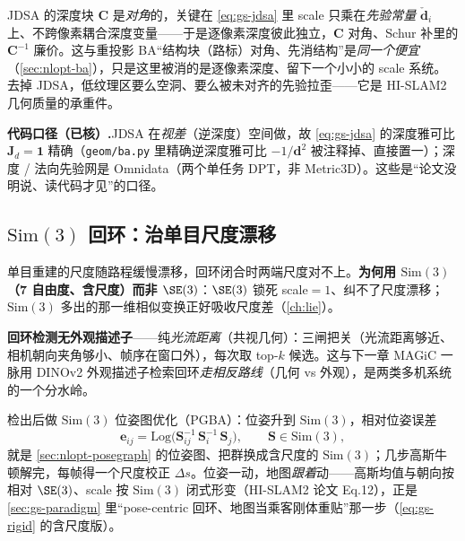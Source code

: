 \begin{insight}
JDSA 的深度块 $\mathbf C$ 是\emph{对角}的，关键在 \cref{eq:gs-jdsa} 里 scale 只乘在\emph{先验常量} $\check{\mathbf d}_i$ 上、不跨像素耦合深度变量——于是逐像素深度彼此独立，$\mathbf C$ 对角、Schur 补里的 $\mathbf C^{-1}$ 廉价。这与重投影 BA“结构块（路标）对角、先消结构”是\emph{同一个便宜}（\cref{sec:nlopt-ba}），只是这里被消的是逐像素深度、留下一个小小的 scale 系统。去掉 JDSA，低纹理区要么空洞、要么被未对齐的先验拉歪——它是 HI-SLAM2 几何质量的承重件。
\end{insight}

\begin{note}
\textbf{代码口径（已核）.}\;JDSA 在\emph{视差}（逆深度）空间做，故 \cref{eq:gs-jdsa} 的深度雅可比 $\mathbf J_d=\mathbf 1$ 精确（\texttt{geom/ba.py} 里精确逆深度雅可比 $-1/\mathbf d^2$ 被注释掉、直接置一）；深度 / 法向先验网是 Omnidata（两个单任务 DPT，非 Metric3D）。这些是“论文没明说、读代码才见”的口径。
\end{note}

\subsection{$\mathrm{Sim}(3)$ 回环：治单目尺度漂移}

单目重建的尺度随路程缓慢漂移，回环闭合时两端尺度对不上。\textbf{为何用 $\mathrm{Sim}(3)$（7 自由度、含尺度）而非 $\SE(3)$}：$\SE(3)$ 锁死 scale$=1$、纠不了尺度漂移；$\mathrm{Sim}(3)$ 多出的那一维相似变换正好吸收尺度差（\cref{ch:lie}）。

\textbf{回环检测无外观描述子}——纯\emph{光流距离}（共视几何）：三闸把关（光流距离够近、相机朝向夹角够小、帧序在窗口外），每次取 top-$k$ 候选。这与下一章 MAGiC 一脉用 DINOv2 外观描述子检索回环\emph{走相反路线}（几何 vs 外观），是两类多机系统的一个分水岭。

检出后做 $\mathrm{Sim}(3)$ 位姿图优化（PGBA）：位姿升到 $\mathrm{Sim}(3)$，相对位姿误差
\begin{equation}
\mathbf e_{ij}=\mathrm{Log}\big(\mathbf S_{ij}^{-1}\,\mathbf S_i^{-1}\,\mathbf S_j\big),\qquad \mathbf S\in\mathrm{Sim}(3),
\label{eq:gs-sim3pgo}
\end{equation}
就是 \cref{sec:nlopt-posegraph} 的位姿图、把群换成含尺度的 $\mathrm{Sim}(3)$；几步高斯牛顿解完，每帧得一个尺度校正 $\Delta s$。位姿一动，地图\emph{跟着}动——高斯均值与朝向按相对 $\SE(3)$、scale 按 $\mathrm{Sim}(3)$ 闭式形变（HI-SLAM2 论文 Eq.12），正是 \cref{sec:gs-paradigm} 里“pose-centric 回环、地图当乘客刚体重贴”那一步（\cref{eq:gs-rigid} 的含尺度版）。

